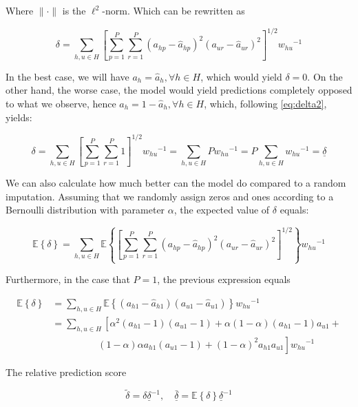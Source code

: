\documentclass{article}
\newcommand{\Expected}[1]{{\mathbb{E}\left\{#1\right\}}}
\begin{document}
Where $\|\cdot\|$ is the $\ell^2$-norm. Which can be rewritten as

\begin{equation}
\label{eq:delta2}
\delta = \sum_{h, u \in H}\left[\sum_{p=1}^P\sum_{r=1}^P (a_{hp} - \hat a_{hp})^2(a_{ur} - \hat a_{ur})^2\right]^{1/2}{w_{hu}}^{-1}
\end{equation}

In the best case, we will have $a_h = \hat a_h, \forall h \in H$, which would yield $\delta = 0$. On the other hand, the worse case, the model would yield predictions completely opposed to what we observe, hence $a_h = 1 - \hat a_h, \forall h \in H$, which, following \eqref{eq:delta2}, yields:

\begin{equation*}
\delta  = \sum_{h, u \in H}\left[\sum_{p=1}^P\sum_{r=1}^P 1\right]^{1/2}{w_{hu}}^{-1} = \sum_{h, u \in H}P{w_{hu}}^{-1} = P \sum_{h, u \in H}{w_{hu}}^{-1} = \underline{\delta}
\end{equation*}



We can also calculate how much better can the model do compared to a random imputation. Assuming that we randomly assign zeros and ones according to a Bernoulli distribution with parameter $\alpha$, the expected value of $\delta$ equals:

\begin{equation*}
\Expected{\delta} = \sum_{h, u \in H}\Expected{\left[\sum_{p=1}^P\sum_{r=1}^P (a_{hp} - \hat a_{hp})^2(a_{ur} - \hat a_{ur})^2\right]^{1/2}}{w_{hu}}^{-1}
\end{equation*}

Furthermore, in the case that $P = 1$, the previous expression equals

\begin{align*}
\Expected{\delta} & = \sum_{h, u \in H}\Expected{(a_{h1} - \hat a_{h1})(a_{u1} - \hat a_{u1})}{w_{hu}}^{-1} \\
& = \sum_{h, u \in H}\left[%
\alpha^2(a_{h1} - 1)(a_{u1} - 1) + %
\alpha(1-\alpha)(a_{h1} - 1)a_{u1} +\right. \\
& \left.\hspace{2cm} (1-\alpha)\alpha a_{h1}(a_{u1} - 1) + %
(1-\alpha)^2a_{h1}a_{u1} 
\right]{w_{hu}}^{-1}
\end{align*}

The relative prediction score 

\begin{equation}
\tilde\delta = \delta \underline{\delta}^{-1},\quad \underline{\bar{\delta}} = \Expected{\delta}\underline{\delta}^{-1}
\end{equation}
\end{document}
